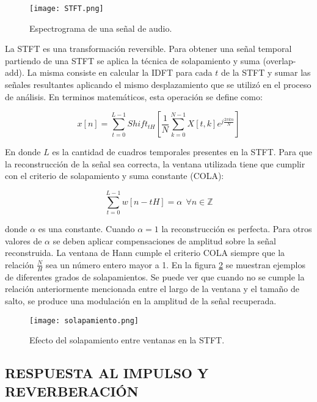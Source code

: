  \begin{figure}[H]
  \centering{}
  \texttt{[image: STFT.png]}
  \caption{Espectrograma de una señal de audio.}
  \label{fig:STFT}
\end{figure}

La STFT es una transformación reversible. Para obtener una señal temporal partiendo de una STFT se aplica la técnica de solapamiento y suma (overlap-add). La misma consiste en calcular la IDFT para cada $t$ de la STFT y sumar las señales resultantes aplicando el mismo desplazamiento que se utilizó en el proceso de análisis. En terminos matemáticos, esta operación se define como:

\begin{equation}
\label{eqn:ISTFT}
	x[n] = \sum_{t=0}^{L-1}Shift_{tH}[\frac{1}{N}\sum_{k=0}^{N-1}X[t,k]e^{j\frac{2\pi kn}{N}}]
\end{equation}

En donde $L$ es la cantidad de cuadros temporales presentes en la STFT. Para que la reconstrucción de la señal sea correcta, la ventana utilizada tiene que cumplir con el criterio de solapamiento y suma constante (COLA):

\begin{equation}
\label{eqn:COLA}
		\sum_{t=0}^{L-1}w[n-tH] = \alpha \ \ \forall n \in  \mathbb{Z}
\end{equation}

donde $\alpha$ es una constante. Cuando $\alpha = 1$ la reconstrucción es perfecta. Para otros valores de $\alpha$ se deben aplicar compensaciones de amplitud sobre la señal reconstruida. La ventana de Hann cumple el criterio COLA siempre que la relación $\frac{N}{H}$ sea un número entero mayor a 1. En la figura \ref{fig:solapa} se muestran ejemplos de diferentes grados de solapamientos. Se puede ver que cuando no se cumple la relación anteriormente mencionada entre el largo de la ventana y el tamaño de salto, se produce una modulación en la amplitud de la señal recuperada. 

 \begin{figure}[H]
  \centering{}
  \texttt{[image: solapamiento.png]}
  \caption{Efecto del solapamiento entre ventanas en la STFT.}
  \label{fig:solapa}
\end{figure}

\subsection[Respuesta al impulso y reverberación]{RESPUESTA AL IMPULSO Y REVERBERACIÓN}

